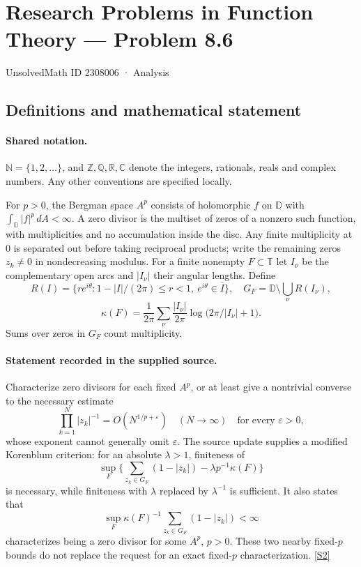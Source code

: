 \documentclass[11pt]{article}
\newcommand{\sref}[2]{\hyperlink{source:#1:#2}{[S#2]}}
\begin{document}
\setcounter{section}{2308005}
\section{Research Problems in Function Theory — Problem 8.6}\label{2308006}
{\small\sffamily UnsolvedMath ID 2308006 · Analysis}
\subsection{Definitions and mathematical statement}

\paragraph{Shared notation.}$\mathbb N=\{1,2,\ldots\}$, and $\mathbb Z,\mathbb Q,\mathbb R,\mathbb C$ denote the integers, rationals, reals and complex numbers. Any other conventions are specified locally.


For $p>0$, the Bergman space $A^p$ consists of holomorphic $f$ on $\mathbb D$ with $\int_{\mathbb D}|f|^p\,dA<\infty$. A zero divisor is the multiset of zeros of a nonzero such function, with multiplicities and no accumulation inside the disc. Any finite multiplicity at $0$ is separated out before taking reciprocal products; write the remaining zeros $z_k\ne0$ in nondecreasing modulus. For a finite nonempty $F\subset\mathbb T$ let $I_\nu$ be the complementary open arcs and $|I_\nu|$ their angular lengths. Define
\[R(I)=\{re^{i\theta}:1-|I|/(2\pi)\le r<1,\ e^{i\theta}\in\overline I\},
\quad G_F=\mathbb D\setminus\bigcup_\nu R(I_\nu),
\]
\[\kappa(F)=\frac1{2\pi}\sum_\nu\frac{|I_\nu|}{2\pi}
\log\big(2\pi/|I_\nu|+1\big).
\]
Sums over zeros in $G_F$ count multiplicity.
\paragraph{Statement recorded in the supplied source.}
Characterize zero divisors for each fixed $A^p$, or at least give a nontrivial converse to the necessary estimate
\[\prod_{k=1}^N|z_k|^{-1}=O(N^{1/p+\varepsilon})\quad(N\to\infty)
\quad\text{for every }\varepsilon>0,
\]
whose exponent cannot generally omit $\varepsilon$. The source update supplies a modified Korenblum criterion: for an absolute $\lambda>1$, finiteness of
\[\sup_F\big\{\sum_{z_k\in G_F}(1-|z_k|)-\lambda p^{-1}\kappa(F)\big\}
\]
is necessary, while finiteness with $\lambda$ replaced by $\lambda^{-1}$ is sufficient. It also states that
\[\sup_F\kappa(F)^{-1}\sum_{z_k\in G_F}(1-|z_k|)<\infty
\]
characterizes being a zero divisor for some $A^p$, $p>0$. These two nearby fixed-$p$ bounds do not replace the request for an exact fixed-$p$ characterization. \sref{2308006}{2}
\end{document}
